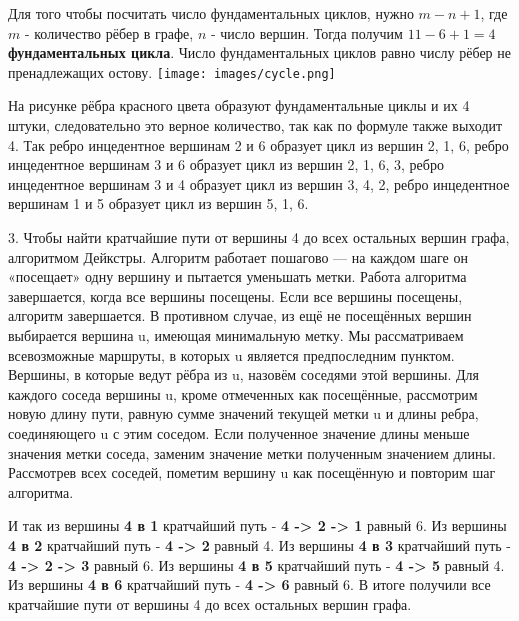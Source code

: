 \documentclass[a4paper]{article}
\begin{document}
\begin{center}
\begin{flushleft}
Для того чтобы посчитать число фундаментальных циклов, нужно $m - n + 1$, где $m$ - количество рёбер в графе, $n$ - число вершин. Тогда получим $11 - 6 + 1 = 4$ \textbf{фундаментальных цикла}. Число фундаментальных циклов равно числу рёбер не пренадлежащих остову.
\texttt{[image: images/cycle.png]}
\end{flushleft}
\begin{flushleft}
На рисунке рёбра красного цвета образуют фундаментальные циклы и их 4 штуки, следовательно это верное количество, так как по формуле также выходит 4. Так ребро инцедентное вершинам 2 и 6 образует цикл из вершин 2, 1, 6, ребро инцедентное вершинам 3 и 6 образует цикл из вершин 2, 1, 6, 3, ребро инцедентное вершинам 3 и 4 образует цикл из вершин 3, 4, 2, ребро инцедентное вершинам 1 и 5 образует цикл из вершин 5, 1, 6.
\end{flushleft}
\begin{flushleft}
3. Чтобы найти кратчайшие пути от вершины 4 до всех остальных вершин графа, алгоритмом Дейкстры. Алгоритм работает пошагово — на каждом шаге он «посещает» одну вершину и пытается уменьшать метки. Работа алгоритма завершается, когда все вершины посещены.
Если все вершины посещены, алгоритм завершается. В противном случае, из ещё не посещённых вершин выбирается вершина u, имеющая минимальную метку. Мы рассматриваем всевозможные маршруты, в которых u является предпоследним пунктом. Вершины, в которые ведут рёбра из u, назовём соседями этой вершины. Для каждого соседа вершины u, кроме отмеченных как посещённые, рассмотрим новую длину пути, равную сумме значений текущей метки u и длины ребра, соединяющего u с этим соседом. Если полученное значение длины меньше значения метки соседа, заменим значение метки полученным значением длины. Рассмотрев всех соседей, пометим вершину u как посещённую и повторим шаг алгоритма.
\end{flushleft}
\begin{flushleft}
И так из вершины \textbf{4 в 1} кратчайший путь - \textbf{4 -> 2 -> 1} равный 6.
Из вершины \textbf{4 в 2} кратчайший путь - \textbf{4 -> 2} равный 4.
Из вершины \textbf{4 в 3} кратчайший путь - \textbf{4 -> 2 -> 3} равный 6.
Из вершины \textbf{4 в 5} кратчайший путь - \textbf{4 -> 5} равный 4.
Из вершины \textbf{4 в 6} кратчайший путь - \textbf{4 -> 6} равный 6.
В итоге получили все кратчайшие пути от вершины 4 до всех остальных вершин графа.
\end{flushleft}
\end{center}
\end{document}
